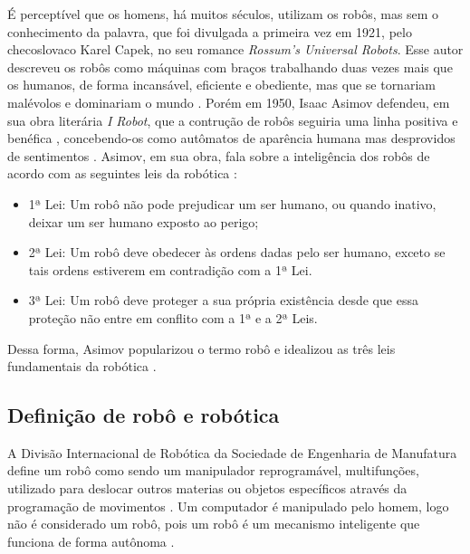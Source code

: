 É perceptível que os homens, há muitos séculos, utilizam os robôs, mas sem o conhecimento da palavra, que foi divulgada a primeira vez em 1921, pelo checoslovaco Karel Capek, no seu romance \textit{Rossum's Universal Robots}. Esse autor descreveu os robôs como máquinas com braços trabalhando duas vezes mais que os humanos, de forma incansável, eficiente e obediente, mas que se tornariam malévolos e dominariam o mundo \cite{santos2002robotica}. Porém em 1950, Isaac Asimov defendeu, em sua obra literária \textit{I Robot}, que a contrução de robôs seguiria uma linha positiva e benéfica , concebendo-os como autômatos de aparência humana mas desprovidos de sentimentos \cite{santos2002robotica}.
Asimov, em sua obra, fala sobre a inteligência dos robôs de acordo com as seguintes leis da robótica \cite{santos2002robotica}:
\begin{itemize}
\item 1ª Lei: Um robô não pode prejudicar um ser humano, ou quando inativo, deixar um ser humano exposto ao perigo;
\item 2ª Lei: Um robô deve obedecer às ordens dadas pelo ser humano, exceto se tais ordens  estiverem em contradição com a 1ª Lei.
\item 3ª Lei: Um robô deve proteger a sua própria existência desde que essa proteção não entre em conflito com a 1ª e a 2ª Leis.
\end{itemize}
Dessa forma, Asimov popularizou o termo robô e idealizou as três leis fundamentais da robótica \cite{de2008utilizaccao}.

\subsection{Definição de robô e robótica}
A Divisão Internacional de Robótica da Sociedade de Engenharia de Manufatura define um robô como sendo um manipulador reprogramável, multifunções, utilizado para deslocar outros materias ou objetos específicos através da programação de movimentos \cite{de2008utilizaccao}. Um computador é manipulado pelo homem, logo não é considerado um robô, pois um robô é um mecanismo inteligente que funciona de forma autônoma \cite{curcio2008instituto}.
	
